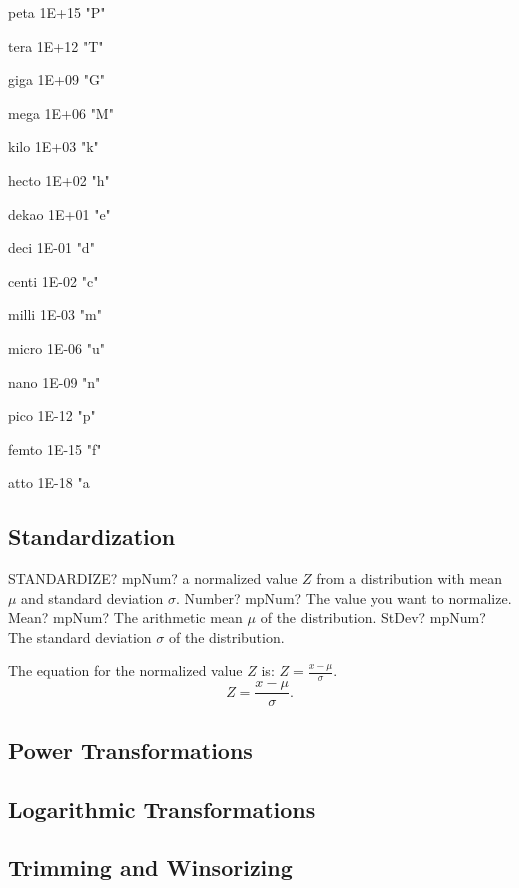 peta 1E+15 "P" 

tera 1E+12 "T" 

giga 1E+09 "G" 

mega 1E+06 "M" 

kilo 1E+03 "k" 

hecto 1E+02 "h" 

dekao 1E+01 "e" 

deci 1E-01 "d" 

centi 1E-02 "c" 

milli 1E-03 "m" 

micro 1E-06 "u" 

nano 1E-09 "n" 

pico 1E-12 "p" 

femto 1E-15 "f" 

atto 1E-18 "a 







\subsection{Standardization}

\begin{mpFunctionsExtract}
	\mpWorksheetFunctionThreeNotImplemented
	{STANDARDIZE? mpNum? a normalized value  $Z$ from a distribution with mean $\mu$ and standard deviation $\sigma$.}
	{Number? mpNum? The value you want to normalize.}
	{Mean? mpNum? The arithmetic mean $\mu$ of the distribution.}
	{StDev? mpNum? The standard deviation  $\sigma$ of the distribution.}
\end{mpFunctionsExtract}

\vspace{0.3cm}
The equation for the normalized value $Z$ is: $Z=\frac{x-\mu}{\sigma}$.
\begin{equation}
Z=\frac{x-\mu}{\sigma}.
\end{equation}



\subsection{Power Transformations}
\lipsum[2]


\subsection{Logarithmic Transformations}
\lipsum[3]


\subsection{Trimming and Winsorizing}

